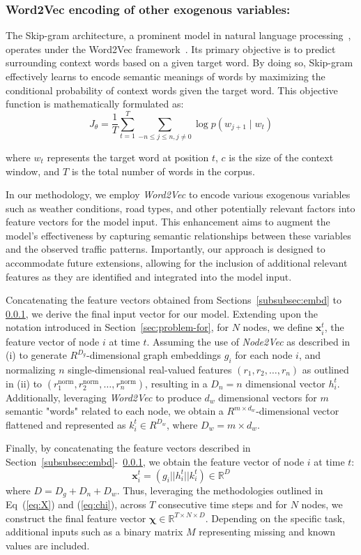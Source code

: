 \subsubsection{Word2Vec encoding of other exogenous variables:}\label{subsubsec:encode}
The Skip-gram architecture, a prominent model in natural language processing~\cite{skipgram}, operates under the Word2Vec framework~\cite{word2vec}. Its primary objective is to predict surrounding context words based on a given target word. By doing so, Skip-gram effectively learns to encode semantic meanings of words by maximizing the conditional probability of context words given the target word. This objective function is mathematically formulated as:
\[
J_\theta = \frac{1}{T}\sum^{T}_{t=1}\sum_{-n\leq j \leq n, j \neq 0}\log p\left(w_{j+1} \mid w_{t}\right)
\]

where \( w_t \) represents the target word at position \( t \), \( c \) is the size of the context window, and \( T \) is the total number of words in the corpus.

In our methodology, we employ \textit{Word2Vec} \cite{word2vec} to encode various exogenous variables such as weather conditions, road types, and other potentially relevant factors into feature vectors for the model input. This enhancement aims to augment the model's effectiveness by capturing semantic relationships between these variables and the observed traffic patterns. Importantly, our approach is designed to accommodate future extensions, allowing for the inclusion of additional relevant features as they are identified and integrated into the model input.

Concatenating the feature vectors obtained from Sections~\ref{subsubsec:embd} to \ref{subsubsec:encode}, we derive the final input vector for our model. Extending upon the notation introduced in Section~\ref{sec:problem-for}, for $N$ nodes, we define $\mathbf{x}_i^t$, the feature vector of node $i$ at time $t$. Assuming the use of \textit{Node2Vec} as described in (i) to generate $R^{D_g}$-dimensional graph embeddings $g_i$ for each node $i$, and normalizing $n$ single-dimensional real-valued features $(r_1, r_2, \ldots, r_n)$ as outlined in (ii) to $(r_1^{\text{norm}}, r_2^{\text{norm}}, \ldots, r_n^{\text{norm}})$, resulting in a $D_n = n$ dimensional vector $h_i^t$. Additionally, leveraging \textit{Word2Vec} to produce $d_w$ dimensional vectors for $m$ semantic "words" related to each node, we obtain a $R^{m \times d_w}$-dimensional vector flattened and represented as $k_i^t \in R^{D_w}$, where $D_w = m \times d_w$.

Finally, by concatenating the feature vectors described in Section~\ref{subsubsec:embd}-~\ref{subsubsec:encode}, we obtain the feature vector of node $i$ at time $t$:
\[
\mathbf{x}_i^t = ( g_i || h_i^t || k_i^t ) \in \mathbb{R}^D
\]
where $D = D_g + D_n + D_w$. Thus, leveraging the methodologies outlined in Eq~(\ref{eq:X}) and (\ref{eq:chi}), across $T$ consecutive time steps and for $N$ nodes, we construct the final feature vector $\mathbf{\chi} \in \mathbb{R}^{T \times N \times D}$. Depending on the specific task, additional inputs such as a binary matrix $M$ representing missing and known values are included. %
